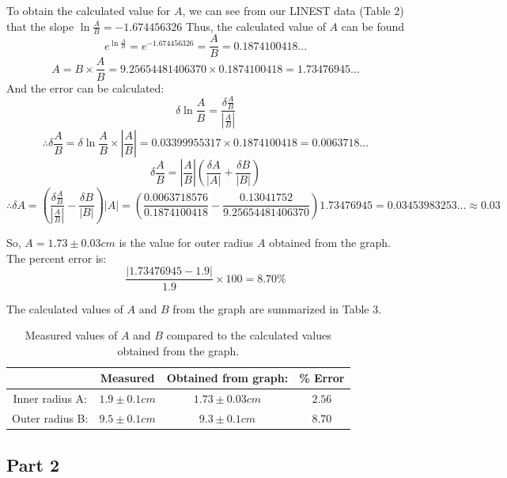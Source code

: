 \documentclass[letterpaper]{article}
\begin{document}
\noindent To obtain the calculated value for $A$, we can see from our LINEST data (Table 2) that the slope $\ln{\frac{A}{B}}=-1.674456326$
Thus, the calculated value of $A$ can be found
$$ e^{\ln{\frac{A}{B}}}=e^{-1.674456326} = \frac{A}{B} = 0.1874100418... $$
$$ A= B \times \frac{A}{B} = 9.25654481406370 \times 0.1874100418 = 1.73476945...$$
And the error can be calculated:
$$ \delta \ln{\frac{A}{B}} =\frac{\delta{\frac{A}{B}}}{|\frac{A}{B}|}  $$
$$ \therefore \delta \frac{A}{B} = \delta \ln{\frac{A}{B}} \times \left|{\frac{A}{B}}\right| = 0.03399955317 \times 0.1874100418 = 0.0063718...$$
$$ \delta \frac{A}{B} = \left|\frac{A}{B}\right|\left(\frac{\delta A}{|A|}+\frac{\delta B}{|B|}\right) $$
$$ \therefore \delta A = \left(\frac{\delta \frac{A}{B}}{|\frac{A}{B}|} - \frac{\delta B}{|B|} \right)|A| = \left( \frac{0.0063718576}{0.1874100418} - \frac{0.13041752}{9.25654481406370} \right)
 1.73476945 = 0.03453983253...\approx 0.03$$

\noindent So, $A=1.73 \pm 0.03 cm$ is the value for outer radius $A$ obtained from the graph.
The percent error is:
$$ \frac{|1.73476945-1.9|}{1.9}\times100 = 8.70\%$$

\vspace{1cm}
\noindent The calculated values of $A$ and $B$ from the graph are summarized in Table 3.
\begin{table}[H]
\centering
\begin{tabular}{c|c|c|c|}
                & Measured            & Obtained from graph: & \% Error \\ \hline
Inner radius A: & $1.9 \pm 0.1 cm$      & $1.73 \pm 0.03 cm$           &    $2.56$  \\ \hline
Outer radius B: & $9.5 \pm 0.1 cm$      & $9.3 \pm 0.1 cm  $           &    $8.70$  \\ \hline
\end{tabular}
\caption{Measured values of $A$ and $B$ compared to the calculated values obtained from the graph.}
\end{table}

\subsection{Part 2}
\end{document}
